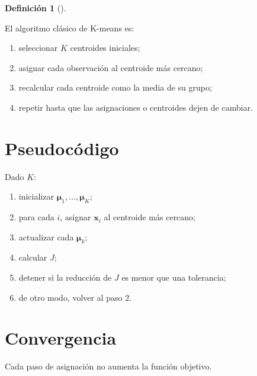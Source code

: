 \documentclass[
  spanish,
  10.5pt,
  letterpaper,
  DIV=11,
  numbers=noendperiod,
  oneside,
  open=any]{scrreprt}
\providecommand{\tightlist}{%
  \setlength{\itemsep}{0pt}\setlength{\parskip}{0pt}}
\theoremstyle{definition}
\newtheorem{definition}{Definición}[chapter]
\theoremstyle{definition}
\theoremstyle{plain}
\theoremstyle{remark}
\begin{document}

\begin{definition}[]\protect\hypertarget{def-algoritmo-lloyd}{}\label{def-algoritmo-lloyd}

El algoritmo clásico de K-means es:

\begin{enumerate}
\def\labelenumi{\arabic{enumi}.}
\tightlist
\item
  seleccionar \(K\) centroides iniciales;
\item
  asignar cada observación al centroide más cercano;
\item
  recalcular cada centroide como la media de su grupo;
\item
  repetir hasta que las asignaciones o centroides dejen de cambiar.
\end{enumerate}

\end{definition}

\section*{Pseudocódigo}\label{pseudocuxf3digo-2}


Dado \(K\):

\begin{enumerate}
\def\labelenumi{\arabic{enumi}.}
\tightlist
\item
  inicializar \(\boldsymbol{\mu}_1,\ldots,\boldsymbol{\mu}_K\);
\item
  para cada \(i\), asignar \(\mathbf{x}_i\) al centroide más cercano;
\item
  actualizar cada \(\boldsymbol{\mu}_k\);
\item
  calcular \(J\);
\item
  detener si la reducción de \(J\) es menor que una tolerancia;
\item
  de otro modo, volver al paso 2.
\end{enumerate}

\section*{Convergencia}\label{convergencia-1}


Cada paso de asignación no aumenta la función objetivo.
\end{document}
